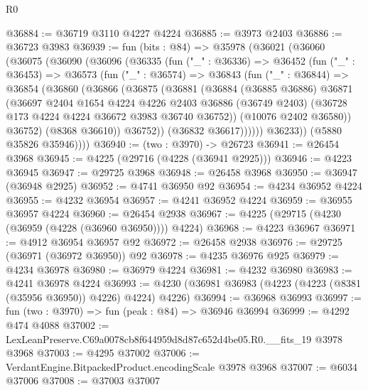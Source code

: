 \begin{lexlean}{R0}
\begin{coremodule}
@36884 := @36719 @3110 @4227 @4224
@36885 := @3973 @2403
@36886 := @36723 @3983
@36939 := fun (bits : @84) =>
  @35978
    (@36021
      (@36060
        (@36075
          (@36090
            (@36096
              (@36335
                (fun ("_" : @36336) =>
                @36452
                  (fun ("_" : @36453) =>
                  @36573
                    (fun ("_" : @36574) =>
                    @36843
                      (fun ("_" : @36844) =>
                      @36854
                        (@36860
                          (@36866
                            (@36875
                              (@36881
                                (@36884
                                  (@36885 @36886)
                                  @36871
                                  (@36697
                                    @2404
                                    @1654
                                    @4224
                                    @4226
                                    @2403
                                    @36886
                                    (@36749 @2403)
                                    (@36728 @173 @4224 @4224 @36672 @3983 @36740 @36752))
                                  (@10076 @2402 @36580))
                                @36752)
                              (@8368 @36610))
                            @36752))
                        (@36832 @36617))))))
              @36233))
          (@5880 @35826 @35946))))
@36940 := (two : @3970) -> @26723
@36941 := @26454 @3968
@36945 := @4225 (@29716 (@4228 (@36941 @2925)))
@36946 := @4223 @36945
@36947 := @29725 @3968
@36948 := @26458 @3968
@36950 := @36947 (@36948 @2925)
@36952 := @4741 @36950 @92
@36954 := @4234 @36952 @4224
@36955 := @4232 @36954
@36957 := @4241 @36952 @4224
@36959 := @36955 @36957 @4224
@36960 := @26454 @2938
@36967 := @4225 (@29715 (@4230 (@36959 (@4228 (@36960 @36950)))) @4224)
@36968 := @4223 @36967
@36971 := @4912 @36954 @36957 @92
@36972 := @26458 @2938
@36976 := @29725 (@36971 (@36972 @36950)) @92
@36978 := @4235 @36976 @925
@36979 := @4234 @36978
@36980 := @36979 @4224
@36981 := @4232 @36980
@36983 := @4241 @36978 @4224
@36993 := @4230 (@36981 @36983 (@4223 (@4223 (@8381 (@35956 @36950)) @4226) @4224) @4226)
@36994 := @36968 @36993
@36997 := fun (two : @3970) => fun (peak : @84) => @36946 @36994
@36999 := @4292 @474 @4088
@37002 := LexLeanPreserve.C69a0078cb8f644959d8d87c652d4be05.R0.__fits_19 @3978 @3968
@37003 := @4295 @37002
@37006 := VerdantEngine.BitpackedProduct.encodingScale @3978 @3968
@37007 := @6034 @37006
@37008 := @37003 @37007

\end{coremodule}
\end{lexlean}
